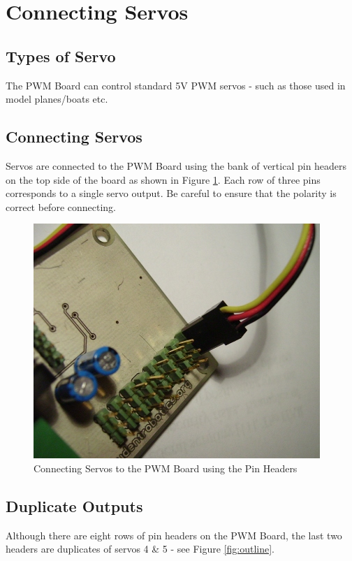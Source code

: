 \documentclass[a4paper, 12pt]{article}
\begin{document}
\section{Connecting Servos}
\subsection{Types of Servo}
The PWM Board can control standard 5V PWM servos - such as those used in model planes/boats etc. 

\subsection{Connecting Servos}
Servos are connected to the PWM Board using the bank of vertical pin headers on the top side of the board as shown in Figure \ref{fig:servo-header}. Each row of three pins corresponds to a single servo output. Be careful to ensure that the polarity is correct before connecting. 

\vspace{12pt}

\begin{figure}[h]
\centering
\includegraphics[scale=0.6, angle=0]{servo-header}
\caption{Connecting Servos to the PWM Board using the Pin Headers}
\label{fig:servo-header}
\end{figure}

\subsection{Duplicate Outputs}
Although there are eight rows of pin headers on the PWM Board, the last two headers are duplicates of servos 4 \& 5 - see Figure \ref{fig:outline}.  
\end{document}
